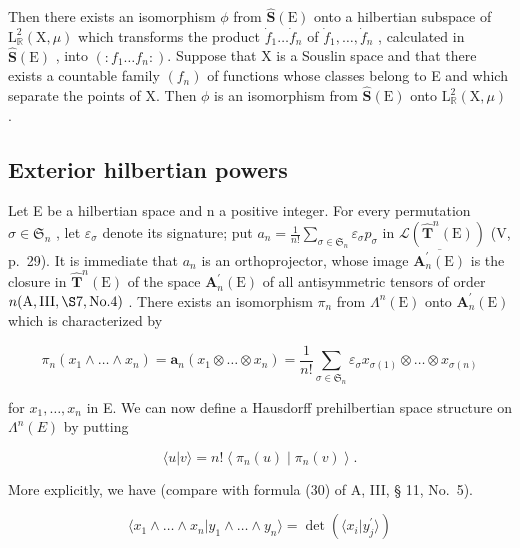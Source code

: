 Then there exists an isomorphism \(\phi\) from \(\hat{\mathbf{S}}(\mathrm{E})\) onto a hilbertian subspace of \(\mathrm{L}_{\mathbb{R}}^{2}(\mathrm{X},\mu)\) which transforms the product \(\dot{f}_1\dots \dot{f}_n\) of \(\dot{f}_1,\dots ,\dot{f}_n\) , calculated in \(\hat{\mathbf{S}}(\mathrm{E})\) , into \((:f_1\dots f_n:)\). Suppose that X is a Souslin space and that there exists a countable family \((f_{n})\) of functions whose classes belong to E and which separate the points of X. Then \(\phi\) is an isomorphism from \(\hat{\mathbf{S}}(\mathrm{E})\) onto \(\mathrm{L}_{\mathbb{R}}^{2}(\mathrm{X},\mu)\) .

\subsection{Exterior hilbertian powers}

Let E be a hilbertian space and n a positive integer. For every permutation \(\sigma\in\mathfrak{S}_{n}\) , let \(\varepsilon_{\sigma}\) denote its signature; put \(a_{n}=\frac{1}{n!}\sum_{\sigma\in\mathfrak{S}_{n}}\varepsilon_{\sigma}p_{\sigma}\) in \(\mathcal{L}(\hat{\mathbf{T}}^{n}(\mathrm{E}))\) (V, p.~29). It is immediate that \(a_{n}\) is an orthoprojector, whose image \(\overline{\mathbf{A}_{n}^{\prime}(\mathrm{E})}\) is the closure in \(\hat{\mathbf{T}}^{n}(\mathrm{E})\) of the space \(\mathbf{A}_{n}^{\prime}(\mathrm{E})\) of all antisymmetric tensors of order \(n(\mathrm{A},\mathrm{III},\S7,\mathrm{No}.4)\) . There exists an isomorphism \(\pi_{n}\) from \(\Lambda^{n}(\mathrm{E})\) onto \(\mathbf{A}_{n}^{\prime}(\mathrm{E})\) which is characterized by

\[
\pi_ {n} (x _ {1} \wedge \ldots \wedge x _ {n}) = \mathbf {a} _ {n} (x _ {1} \otimes \ldots \otimes x _ {n}) = \frac {1}{n !} \sum_ {\sigma \in \mathfrak {S} _ {n}} \varepsilon_ {\sigma} x _ {\sigma (1)} \otimes \ldots \otimes x _ {\sigma (n)}\tag{24}
\]

for \(x_{1}, \ldots, x_{n}\) in E. We can now define a Hausdorff prehilbertian space structure on \(\Lambda^{n}(E)\) by putting

\[
\langle u | v \rangle = n! \left\langle \pi_ {n} (u) \mid \pi_ {n} (v) \right\rangle .\tag{25}
\]

More explicitly, we have (compare with formula (30) of A, III, § 11, No.~5).

\[
\langle x _ {1} \wedge \dots \wedge x _ {n} | y _ {1} \wedge \dots \wedge y _ {n} \rangle = \det (\langle x _ {i} | y _ {j} ^ {\prime} \rangle)\tag{26}
\]

